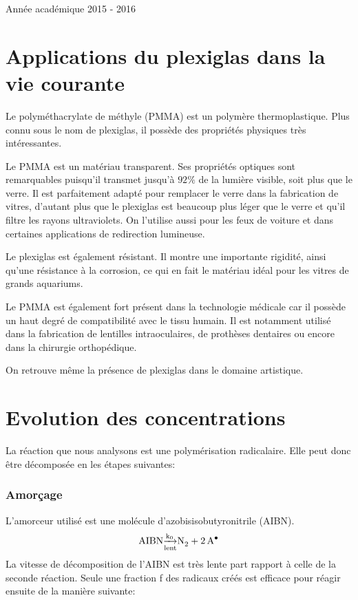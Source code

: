 \documentclass[a4paper,oneside,12pt]{article}
\begin{document}
\begin{titlepage}
	\vspace{0.4cm}
	
	{\normalsize Année académique 2015 - 2016}\\
	
\end{titlepage}

\part{Applications du plexiglas dans la vie courante}

Le polyméthacrylate de méthyle (PMMA) est un polymère thermoplastique. Plus connu sous le nom de plexiglas, il possède des propriétés physiques très intéressantes.

Le PMMA est un matériau transparent. Ses propriétés optiques sont remarquables puisqu'il transmet jusqu'à $92\%$ de la lumière visible, soit plus que le verre. Il est parfaitement adapté pour remplacer le verre dans la fabrication de vitres, d'autant plus que le plexiglas est beaucoup plus léger que le verre et qu'il filtre les rayons ultraviolets. On l'utilise aussi pour les feux de voiture et dans certaines applications de redirection lumineuse.

Le plexiglas est également résistant. Il montre une importante rigidité, ainsi qu'une résistance à la corrosion, ce qui en fait le matériau idéal pour les vitres de grands aquariums.

Le PMMA est également fort présent dans la technologie médicale car il possède un haut degré de compatibilité avec le tissu humain.
Il est notamment utilisé dans la fabrication de lentilles intraoculaires, de prothèses dentaires ou encore dans la chirurgie orthopédique. 

On retrouve même la présence de plexiglas dans le domaine artistique.

\part{Evolution des concentrations}
La réaction que nous analysons est une polymérisation radicalaire. Elle peut donc être décomposée en les étapes suivantes:
\section{Amorçage}
L'amorceur utilisé est une molécule d'azobisisobutyronitrile (AIBN). 
\begin{equation}
	\ce{AIBN \underset{lent}{\xrightarrow{k_0}} N2 + 2A^\bullet}
\end{equation}	
La vitesse de décomposition de l'AIBN est très lente part rapport à celle de la seconde réaction. Seule une fraction f des radicaux créés est efficace pour réagir ensuite de la manière suivante:
\end{document}
